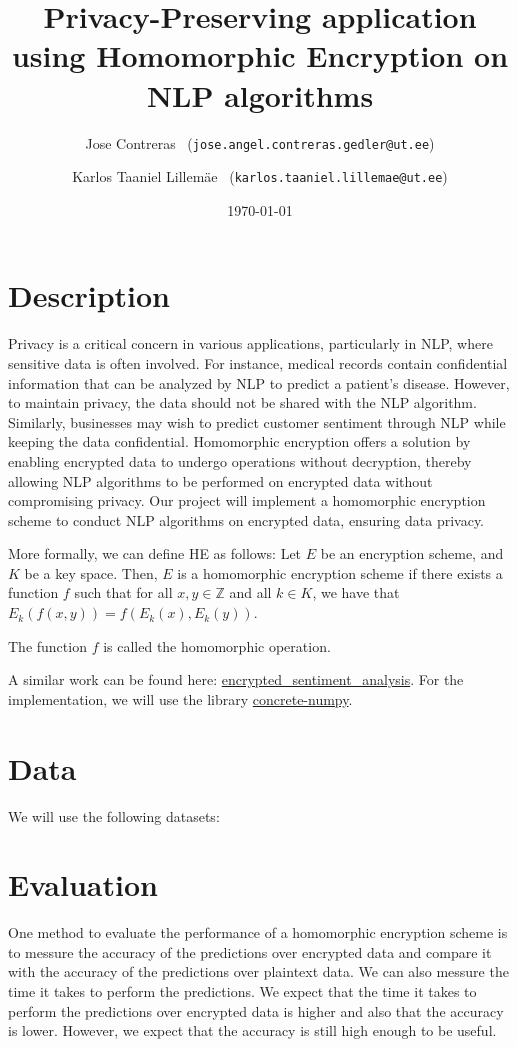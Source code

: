\documentclass{article}
\title{Privacy-Preserving application using Homomorphic Encryption on NLP algorithms}
\author{Jose Contreras \ (\texttt{jose.angel.contreras.gedler@ut.ee}) \\
  \and Karlos Taaniel Lillemäe  \ (\texttt{karlos.taaniel.lillemae@ut.ee}) }
\date{\today}
\begin{document}
\maketitle


\section*{Description}

Privacy is a critical concern in various applications, particularly in NLP, where sensitive data is often involved. For instance, medical records contain confidential information that can be analyzed by NLP to predict a patient's disease. However, to maintain privacy, the data should not be shared with the NLP algorithm. Similarly, businesses may wish to predict customer sentiment through NLP while keeping the data confidential. Homomorphic encryption offers a solution by enabling encrypted data to undergo operations without decryption, thereby allowing NLP algorithms to be performed on encrypted data without compromising privacy. Our project will implement a homomorphic encryption scheme to conduct NLP algorithms on encrypted data, ensuring data privacy.

More formally, we can define HE as follows: Let $E$ be an encryption scheme, and $K$ be a key space. Then, $E$ is a homomorphic encryption scheme if there exists a function $f$ such that for all $x,y \in \mathbb{Z}$ and all $k \in K$, we have that $E_k(f(x,y)) = f(E_k(x), E_k(y))$.

The function $f$ is called the homomorphic operation.

A similar work can be found here: \href{https://huggingface.co/spaces/zama-fhe/encrypted\_sentiment\_analysis}{encrypted\_sentiment\_analysis}. For the implementation, we will use the library \href{https://docs.zama.ai/concrete-numpy/}{concrete-numpy}.

\section*{Data}

We will use the following datasets:




\section*{Evaluation}
One method to evaluate the performance of a homomorphic encryption scheme is to messure the accuracy of the predictions over encrypted data and compare it with the accuracy of the predictions over plaintext data. We can also messure the time it takes to perform the predictions. We expect that the time it takes to perform the predictions over encrypted data is higher and also that the accuracy is lower. However, we expect that the accuracy is still high enough to be useful.
\end{document}
